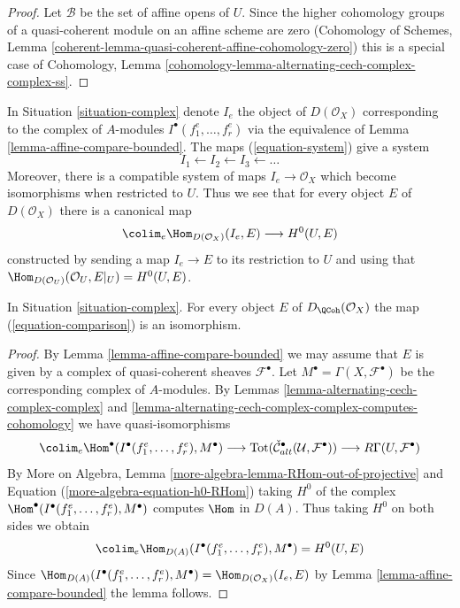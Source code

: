 \begin{proof}
Let $\mathcal{B}$ be the set of affine opens of $U$. Since the higher
cohomology groups of a quasi-coherent module on an affine scheme are zero
(Cohomology of Schemes, Lemma
\ref{coherent-lemma-quasi-coherent-affine-cohomology-zero})
this is a special case of
Cohomology, Lemma \ref{cohomology-lemma-alternating-cech-complex-complex-ss}.
\end{proof}

\noindent
In Situation \ref{situation-complex} denote $I_e$ the object of
$D(\mathcal{O}_X)$ corresponding to the complex of $A$-modules
$I^\bullet(f_1^e, \ldots, f_r^e)$ via the equivalence of
Lemma \ref{lemma-affine-compare-bounded}. The maps
(\ref{equation-system}) give a system
$$
I_1 \leftarrow
I_2 \leftarrow
I_3 \leftarrow \ldots
$$
Moreover, there is a compatible system of maps $I_e \to \mathcal{O}_X$
which become isomorphisms when restricted to $U$. Thus we see that for
every object $E$ of $D(\mathcal{O}_X)$ there is a canonical map
\begin{equation}
\label{equation-comparison}
\colim_e \Hom_{D(\mathcal{O}_X)}(I_e, E) \longrightarrow H^0(U, E)
\end{equation}
constructed by sending a map $I_e \to E$ to its restriction to $U$
and using that
$\Hom_{D(\mathcal{O}_U)}(\mathcal{O}_U, E|_U) = H^0(U, E)$.

\begin{proposition}
\label{proposition-represent-cohomology-class-on-open}
In Situation \ref{situation-complex}. For every object $E$
of $D_\QCoh(\mathcal{O}_X)$ the map
(\ref{equation-comparison}) is an isomorphism.
\end{proposition}

\begin{proof}
By Lemma \ref{lemma-affine-compare-bounded} we may assume that $E$
is given by a complex of quasi-coherent sheaves $\mathcal{F}^\bullet$.
Let $M^\bullet = \Gamma(X, \mathcal{F}^\bullet)$ be the corresponding
complex of $A$-modules. By
Lemmas \ref{lemma-alternating-cech-complex-complex} and
\ref{lemma-alternating-cech-complex-complex-computes-cohomology}
we have quasi-isomorphisms
$$
\colim_e \Hom^\bullet(I^\bullet(f_1^e, \ldots, f_r^e), M^\bullet)
\longrightarrow
\text{Tot}(\check{\mathcal{C}}_{alt}^\bullet(\mathcal{U}, \mathcal{F}^\bullet))
\longrightarrow
R\Gamma(U, \mathcal{F}^\bullet)
$$
By More on Algebra, Lemma \ref{more-algebra-lemma-RHom-out-of-projective} and
Equation (\ref{more-algebra-equation-h0-RHom})
taking $H^0$ of the complex
$\Hom^\bullet(I^\bullet(f_1^e, \ldots, f_r^e), M^\bullet)$
computes $\Hom$ in $D(A)$. Thus taking $H^0$ on both sides we obtain
$$
\colim_e \Hom_{D(A)}(I^\bullet(f_1^e, \ldots, f_r^e), M^\bullet)
=
H^0(U, E)
$$
Since $\Hom_{D(A)}(I^\bullet(f_1^e, \ldots, f_r^e), M^\bullet) =
\Hom_{D(\mathcal{O}_X)}(I_e, E)$ by
Lemma \ref{lemma-affine-compare-bounded} the lemma follows.
\end{proof}

